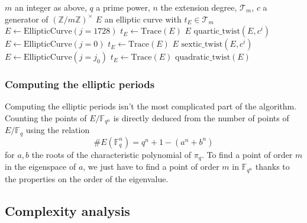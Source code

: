 \documentclass[12pt]{article}
\theoremstyle{plain}
\theoremstyle{definition}
\def\Z{\ensuremath{\mathbb{Z}}}
\def\F{\ensuremath{\mathbb{F}}}
\newcounter{algorithm}
\begin{document}
\begin{algorithm}
    \label{algorithm:selectell}
    \begin{algorithmic}[1]
    \REQUIRE $m$ an integer as above, $q$ a prime power, $n$ the extension
degree, $\mathcal{T}_m$, $c$ a generator of $(\Z/m\Z)^{\times}$
    \ENSURE $E$ an elliptic curve with $t_E\in\mathcal{T}_m$
    \STATE $E\leftarrow \text{EllipticCurve}(j=1728)$
    \STATE $t_E\leftarrow \text{Trace}(E)$
        \RETURN $E$
    \ELSE
                \RETURN $\text{quartic\_twist}(E,c^i)$
            \ENDIF
        \ENDFOR
    \ENDIF
    \STATE $E\leftarrow \text{EllipticCurve}(j=0)$
    \STATE $t_E\leftarrow \text{Trace}(E)$
        \RETURN $E$
    \ELSE
                \RETURN $\text{sextic\_twist}(E,c^i)$
            \ENDIF
        \ENDFOR
    \ENDIF
    \FOR{$j_0\in\F_q$ \AND $j_0\neq0,1728$}
        \STATE $E\leftarrow \text{EllipticCurve}(j=j_0)$
        \STATE $t_E \leftarrow \text{Trace}(E)$
                \RETURN $\text{quadratic\_twist}(E)$
            \ENDIF
        \ENDFOR
    \ENDFOR
    \end{algorithmic}
\end{algorithm}

\subsubsection*{Computing the elliptic periods}

Computing the elliptic periods isn't the most complicated part of the algorithm.
Counting the points of $E/\F_{q^n}$ is directly deduced from the number of
points of $E/\F_q$ using the relation
\begin{equation}
\# E(\F_q^n) = q^n + 1 - (a^n + b^n)
\end{equation}
for $a, b$ the roots of the characteristic polynomial of $\pi_q$. To find a
point of order $m$ in the eigenspace of $a$, we just have to find a point of
order $m$ in $\F_{q^n}$ thanks to the properties on the order of the eigenvalue.

\subsection{Complexity analysis}
\end{document}
